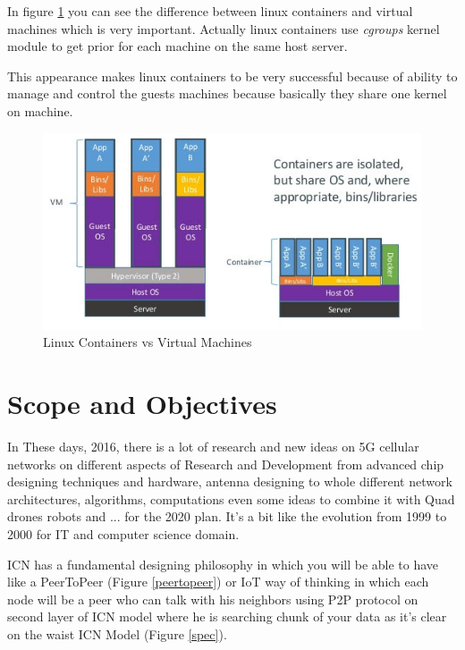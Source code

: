 In figure \ref{lxc} you can see the difference between linux containers and virtual machines which is very important. Actually linux containers use \textit{cgroups} kernel module to get prior for each machine on the same host server.

This appearance makes linux containers to be very successful because of ability to manage and control the guests machines because basically they share one kernel on machine. 

\begin{figure}[H]

\begin{center}

\includegraphics[scale = 0.55]{Pictures/lxc.png}

\caption{Linux Containers vs Virtual Machines} \label{lxc} 

\end{center}

\end{figure}


 
\section{Scope and Objectives}
In These days, 2016,  there is a lot of research and new ideas on 5G cellular networks on different aspects of Research and Development from advanced chip designing techniques and hardware, antenna designing to whole different network architectures, algorithms, computations even some ideas to combine it with Quad drones robots and ... for the 2020 plan. It's a bit like the evolution from 1999 to 2000 for IT and computer science domain.

ICN has a fundamental designing philosophy in which you will be able to have like a PeerToPeer (Figure \ref{peertopeer}) or IoT way of thinking in which each node will be a peer who can talk with his neighbors using P2P protocol on second layer of ICN model where he is searching chunk of your data as it's clear on the waist ICN Model (Figure \ref{spec}). 


